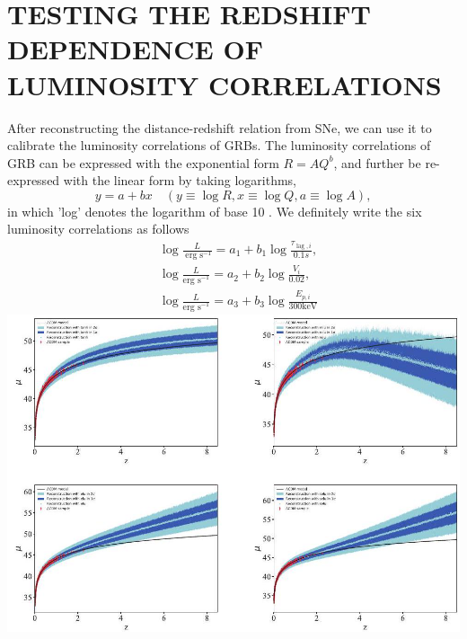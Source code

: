 \documentclass[10pt, a4paper]{article}
\begin{document}
\section{TESTING THE REDSHIFT DEPENDENCE OF LUMINOSITY CORRELATIONS}
After reconstructing the distance-redshift relation from SNe, we can use it to calibrate the luminosity correlations of GRBs. The luminosity correlations of GRB can be expressed with the exponential form $R=A Q^{b}$, and further be re-expressed with the linear form by taking logarithms,
$$
y=a+b x \quad(y \equiv \log R, x \equiv \log Q, a \equiv \log A),
$$
in which 'log' denotes the logarithm of base 10 . We definitely write the six luminosity correlations as follows
$$
\begin{aligned}
& \log \frac{L}{\operatorname{erg} \mathrm{s}^{-1}}=a_{1}+b_{1} \log \frac{\tau_{\operatorname{lag}, i}}{0.1 s}, \\
& \log \frac{L}{\operatorname{erg~s}^{-1}}=a_{2}+b_{2} \log \frac{V_{i}}{0.02}, \\
& \log \frac{L}{\operatorname{erg~s}^{-1}}=a_{3}+b_{3} \log \frac{E_{p, i}}{300 \mathrm{keV}} 
\end{aligned}
$$
\includegraphics[max width=\textwidth]{2022_04_27_cf6124939ea404970a21g-06}
\end{document}
